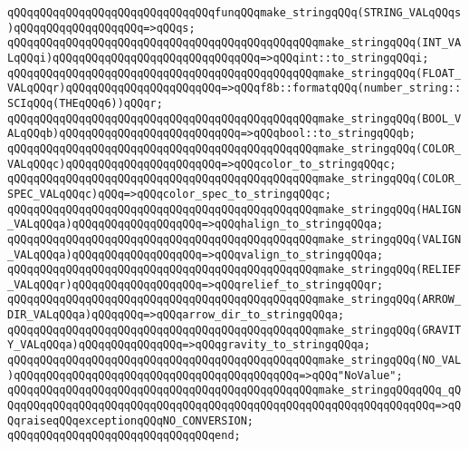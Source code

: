 \newline
\verb|qQQqqQQqqQQqqQQqqQQqqQQqqQQqqQQqfunqQQqmake_stringqQQq(STRING_VALqQQqs)qQQqqQQqqQQqqQQqqQQq=>qQQqs;|\newline
\verb|qQQqqQQqqQQqqQQqqQQqqQQqqQQqqQQqqQQqqQQqqQQqqQQqmake_stringqQQq(INT_VALqQQqi)qQQqqQQqqQQqqQQqqQQqqQQqqQQqqQQq=>qQQqint::to_stringqQQqi;|\newline
\verb|qQQqqQQqqQQqqQQqqQQqqQQqqQQqqQQqqQQqqQQqqQQqqQQqmake_stringqQQq(FLOAT_VALqQQqr)qQQqqQQqqQQqqQQqqQQqqQQq=>qQQqf8b::formatqQQq(number_string::SCIqQQq(THEqQQq6))qQQqr;|\newline
\verb|qQQqqQQqqQQqqQQqqQQqqQQqqQQqqQQqqQQqqQQqqQQqqQQqmake_stringqQQq(BOOL_VALqQQqb)qQQqqQQqqQQqqQQqqQQqqQQqqQQq=>qQQqbool::to_stringqQQqb;|\newline
\verb|qQQqqQQqqQQqqQQqqQQqqQQqqQQqqQQqqQQqqQQqqQQqqQQqmake_stringqQQq(COLOR_VALqQQqc)qQQqqQQqqQQqqQQqqQQqqQQq=>qQQqcolor_to_stringqQQqc;|\newline
\verb|qQQqqQQqqQQqqQQqqQQqqQQqqQQqqQQqqQQqqQQqqQQqqQQqmake_stringqQQq(COLOR_SPEC_VALqQQqc)qQQq=>qQQqcolor_spec_to_stringqQQqc;|\newline
\verb|qQQqqQQqqQQqqQQqqQQqqQQqqQQqqQQqqQQqqQQqqQQqqQQqmake_stringqQQq(HALIGN_VALqQQqa)qQQqqQQqqQQqqQQqqQQq=>qQQqhalign_to_stringqQQqa;|\newline
\verb|qQQqqQQqqQQqqQQqqQQqqQQqqQQqqQQqqQQqqQQqqQQqqQQqmake_stringqQQq(VALIGN_VALqQQqa)qQQqqQQqqQQqqQQqqQQq=>qQQqvalign_to_stringqQQqa;|\newline
\verb|qQQqqQQqqQQqqQQqqQQqqQQqqQQqqQQqqQQqqQQqqQQqqQQqmake_stringqQQq(RELIEF_VALqQQqr)qQQqqQQqqQQqqQQqqQQq=>qQQqrelief_to_stringqQQqr;|\newline
\verb|qQQqqQQqqQQqqQQqqQQqqQQqqQQqqQQqqQQqqQQqqQQqqQQqmake_stringqQQq(ARROW_DIR_VALqQQqa)qQQqqQQq=>qQQqarrow_dir_to_stringqQQqa;|\newline
\verb|qQQqqQQqqQQqqQQqqQQqqQQqqQQqqQQqqQQqqQQqqQQqqQQqmake_stringqQQq(GRAVITY_VALqQQqa)qQQqqQQqqQQqqQQq=>qQQqgravity_to_stringqQQqa;|\newline
\verb|qQQqqQQqqQQqqQQqqQQqqQQqqQQqqQQqqQQqqQQqqQQqqQQqmake_stringqQQq(NO_VAL)qQQqqQQqqQQqqQQqqQQqqQQqqQQqqQQqqQQqqQQqqQQq=>qQQq"NoValue";|\newline
\verb|qQQqqQQqqQQqqQQqqQQqqQQqqQQqqQQqqQQqqQQqqQQqqQQqmake_stringqQQqqQQq_qQQqqQQqqQQqqQQqqQQqqQQqqQQqqQQqqQQqqQQqqQQqqQQqqQQqqQQqqQQqqQQqqQQq=>qQQqraiseqQQqexceptionqQQqNO_CONVERSION;|\newline
\verb|qQQqqQQqqQQqqQQqqQQqqQQqqQQqqQQqend;|\newline
\newline
